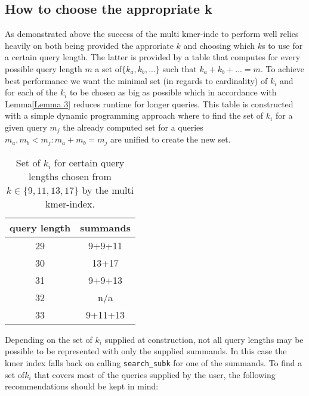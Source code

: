 \subsection{How to choose the appropriate k}
As demonstrated above the success of the multi kmer-inde to perform well relies heavily on both being provided the
approriate $k$ and choosing which $k$s to use for a certain query length. The latter is provided
by a table that computes for every possible query length $m$ a set of$\{k_{a},k_{b},...\}$
such that $k_{a}+k_{b}+...=m$. To achieve best performance we want
the minimal set (in regards to cardinality) of $k_{i}$ and for each of the $k_{i}$ to be chosen as big as possible which
in accordance with Lemma\ref{Lemma 3} reduces runtime for longer queries. This table is constructed with a simple
dynamic programming approach where to find the set of $k_{i}$ for a given query $m_{j}$ the already computed
set for a queries $m_{a},m_{b}<m_{j}:m_{a}+m_{b}=m_{j}$ are unified to create the new set.

\begin{table}[H]
\centering{}\caption{Set of $k_{i}$ for certain query lengths chosen from $k\in\{9,11,13,17\}$
by the multi kmer-index.}
\begin{tabular}{cc}
\toprule
query length & summands\tabularnewline
\midrule
\midrule
29 & 9+9+11\tabularnewline
\midrule
30 & 13+17\tabularnewline
\midrule
31 & 9+9+13\tabularnewline
\midrule
32 & n/a\tabularnewline
\midrule
33 & 9+11+13\tabularnewline
\bottomrule
\end{tabular}
\end{table}

Depending on the set of $k_{i}$ supplied at construction, not all query lengths may
be possible to be represented with only the supplied summands. In this
case the kmer index falls back on calling \lstinline{search_subk}
for one of the summands. To find a set of$k_{i}$ that covers most
of the queries supplied by the user, the following recommendations
should be kept in mind:


